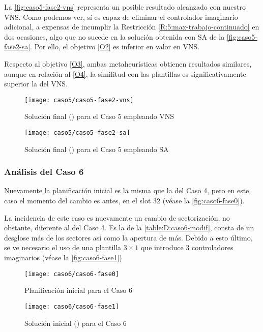 La \autoref{fig:caso5-fase2-vns} representa un posible resultado alcanzado con nuestro VNS. Como podemos ver, sí es capaz de eliminar el controlador imaginario adicional, a expensas de incumplir la Restricción \ref{R:5:max-trabajo-continuado} en dos ocasiones, algo que no sucede en la solución obtenida con SA de la \autoref{fig:caso5-fase2-sa}. Por ello, el objetivo \ref{O2} es inferior en valor en VNS.

Respecto al objetivo \ref{O3}, ambas metaheurísticas obtienen resultados similares, aunque en relación al \ref{O4}, la similitud con las plantillas es significativamente superior la del VNS.

\begin{figure}[!]
	\centering
	\texttt{[image: caso5/caso5-fase2-vns]}
	\caption{Solución final (\fasedos{}) para el Caso 5 empleando VNS}
	\label{fig:caso5-fase2-vns}
\end{figure}

\begin{figure}[!]
	\centering
	\texttt{[image: caso5/caso5-fase2-sa]}
	\caption{Solución final (\fasedos{}) para el Caso 5 empleando SA}
	\label{fig:caso5-fase2-sa}
\end{figure}
\subsubsection{Análisis del Caso 6}

Nuevamente la planificación inicial es la misma que la del Caso 4, pero en este caso el momento del cambio es antes, en el slot 32 (véase la \autoref{fig:caso6-fase0}).

La incidencia de este caso es nuevamente un cambio de sectorización, no obstante, diferente al del Caso 4. Es la de la \autoref{table:D:caso6-modif}, consta de un desglose más de los sectores así como la apertura de más. Debido a esto último, se ve necesario el uso de una plantilla $3 \times 1$ que introduce 3 controladores imaginarios (véase la \autoref{fig:caso6-fase1})

\begin{figure}[!]
	\centering
	\texttt{[image: caso6/caso6-fase0]}
	\caption{Planificación inicial para el Caso 6}
	\label{fig:caso6-fase0}
\end{figure}

\begin{figure}[!]
	\centering
	\texttt{[image: caso6/caso6-fase1]}
	\caption{Solución inicial (\faseuno{}) para el Caso 6}
	\label{fig:caso6-fase1}
\end{figure}


